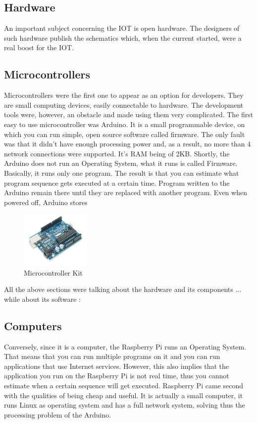 \subsection{Hardware} 
An important subject concerning the IOT is open hardware. The designers of such hardware publish the schematics which, when the current started, were a real boost for the IOT.   

\subsection{Microcontrollers}  
Microcontrollers were the first one to appear as an option for developers. They are small computing devices, easily connectable to hardware. The development tools were, however, an obstacle and made using them very complicated.  
The first easy to use microcontroller was Arduino. It is a small programmable device, on which you can run simple, open source software called firmware. The only fault was that it didn't have enough processing power and, as a result, no more than 4 network connections were supported. It’s RAM being of 2KB. Shortly, the Arduino does not run an Operating System, what it runs is called Firmware. Basically, it runs only one program. The result is that you can estimate what program sequence gets executed at a certain time. Program written to the Arduino remain there until they are replaced with another program. Even when powered off, Arduino stores 

\begin{figure}[ht]
    \centering
    \includegraphics[width=0.3\textwidth]{figures/Microcontroller Kit.jpg}
    \caption{Microcontroller Kit}
\end{figure}

All the above sections were talking about the hardware and its components ... while about its software :

\subsection{Computers}
Conversely, since it is a computer, the Raspberry Pi runs an Operating System. That means that you can run multiple programs on it and you can run applications that use Internet services. However, this also implies that the application you run on the Raspberry Pi is not real time, thus you cannot estimate when a certain sequence will get executed. Raspberry Pi came second with the qualities of being cheap and useful. It is actually a small computer, it runs Linux as operating system and has a full network system, solving thus the processing problem of the Arduino.

